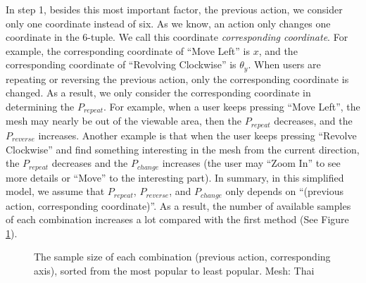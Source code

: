 In step 1, besides this most important factor, the previous action, we consider only one coordinate instead of six.
As we know, an action only changes one coordinate in the 6-tuple. We call this coordinate \textit{corresponding coordinate}.
For example, the corresponding coordinate of ``Move Left'' is $x$, and the corresponding coordinate of 
``Revolving Clockwise'' is $\theta_y$. 
When users are repeating or reversing the previous action, 
only the corresponding coordinate is changed. 
As a result, we only consider the corresponding coordinate in determining the $P_{repeat}$. 
For example, when a user keeps pressing ``Move Left'', the mesh may nearly be out of the viewable area, 
then the $P_{repeat}$ decreases, and the $P_{reverse}$ increases. 
Another example is that when the user keeps pressing ``Revolve Clockwise'' and find something interesting
in the mesh from the current direction,
the $P_{repeat}$ decreases and the $P_{change}$ increases (the user may ``Zoom In'' to see more details or ``Move'' to the interesting part).
In summary, in this simplified model, we assume that $P_{repeat}$, $P_{reverse}$, and $P_{change}$
only depends on ``(previous action, corresponding coordinate)''.
As a result, the number of available samples of each combination increases a lot compared with the first method
(See Figure \ref{f:user:newsample}). 
\begin{figure}
    \centering
    \caption{The sample size of each combination (previous action, corresponding axis), 
    sorted from the most popular to least popular.  Mesh: Thai}
    \label{f:user:newsample}
\end{figure}

